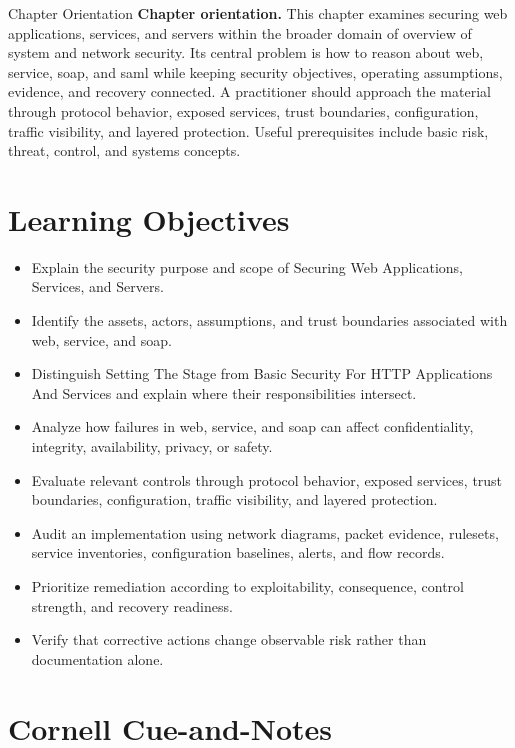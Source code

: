 \documentclass[11pt,letterpaper]{article}
\title{\CornellDocumentTitle}
\author{}
\date{}
\begin{document}
\maketitle
\begin{CornellOverviewBox}{Chapter Orientation}
\textbf{Chapter orientation.} This chapter examines securing web applications, services, and servers within the broader domain of overview of system and network security. Its central problem is how to reason about web, service, soap, and saml while keeping security objectives, operating assumptions, evidence, and recovery connected. A practitioner should approach the material through protocol behavior, exposed services, trust boundaries, configuration, traffic visibility, and layered protection. Useful prerequisites include basic risk, threat, control, and systems concepts.
\end{CornellOverviewBox}
\section*{Learning Objectives}
\begin{itemize}
\item Explain the security purpose and scope of Securing Web Applications, Services, and Servers.
\item Identify the assets, actors, assumptions, and trust boundaries associated with web, service, and soap.
\item Distinguish Setting The Stage from Basic Security For HTTP Applications And Services and explain where their responsibilities intersect.
\item Analyze how failures in web, service, and soap can affect confidentiality, integrity, availability, privacy, or safety.
\item Evaluate relevant controls through protocol behavior, exposed services, trust boundaries, configuration, traffic visibility, and layered protection.
\item Audit an implementation using network diagrams, packet evidence, rulesets, service inventories, configuration baselines, alerts, and flow records.
\item Prioritize remediation according to exploitability, consequence, control strength, and recovery readiness.
\item Verify that corrective actions change observable risk rather than documentation alone.
\end{itemize}
\section*{Cornell Cue-and-Notes}
\end{document}
